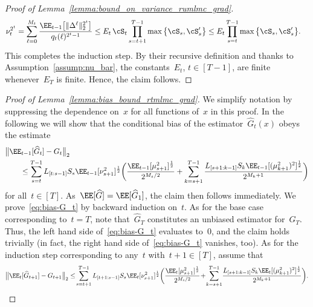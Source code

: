 \documentclass[11pt]{article}
\let\hat\widehat
\begin{document}
\begin{proof}[Proof of Lemma~\ref{lemma:bound_on_variance_rumlmc_grad}]
\begin{align*}                  
    \nu_t^{2^t} & = \sum_{\ell=0}^{M_t} \frac{\EE_{t-1}\big[\|\Delta^\ell\|^{2^t}_{2} \big]}{q_t(\ell)^{2^t-1}} 
    \leq E_t\, \cS_t \prod_{s=t+1}^{T-1} \max\big\{\cS_s, \cS_s^\prime \big\} \leq E_t\prod_{s=t}^{T-1}\max\big\{\cS_s, \cS_s^\prime \big\}.
\end{align*}
This completes the induction step. By their recursive definition and thanks to Assumption~\ref{assump:nu_bar}, the constants~$E_t$, $t \in [T-1]$, are finite whenever~$E_T$ is finite. Hence, the claim follows.
\end{proof}

\begin{proof}[Proof of Lemma~\ref{lemma:bias_bound_rtmlmc_grad}] 
We simplify notation by suppressing the dependence on~$x$ for all functions of~$x$ in this proof. In the following we will show that the conditional bias of the estimator~$\hat{G}_t(x)$ obeys the estimate
\begin{equation}
    \label{eq:bias-G_t}
    \begin{aligned}
    & \big\|\EE_{t-1}[\hat{G}_{t}]-G_{t} \big\|_2 \\ 
    & \qquad \leq \sum_{s=t}^{T-1}L_{[t:s-1]}S_s \EE_{t-1} [\nu_{s+1}^{2}]^\frac{1}{2}\bigg(\frac{ \EE_{t-1}[\mu_{s+1}^{2}]^\frac{1}{2}}{2^{M_s/2}} + \sum_{k=s+1}^{T-1} \frac{L_{[s+1:k-1]}S_k\EE_{t-1} [(\mu_{k+1}^{2})^2]^\frac{1}{2}}{2^{M_k+1}} \bigg)
    \end{aligned}
\end{equation}
for all~$t\in[T]$. As~$\EE[\hat{G}]=\EE[\hat{G}_1]$, the claim then follows immediately. We prove~\eqref{eq:bias-G_t} by backward induction on~$t$. As for the base case corresponding to~$t = T$, note that~$\hat{G}_T$ constitutes an unbiased estimator for~$G_T$. Thus, the left hand side of~\eqref{eq:bias-G_t} evaluates to~$0$, and the claim holds trivially (in fact, the right hand side of~\eqref{eq:bias-G_t} vanishes, too). As for the induction step corresponding to any~$t$ with~$t+1\in[T]$, assume that
\begin{align*}\label{eq:induction_hypothesis_bias_grad}
     \big\|\EE_{t}[\hat{G}_{t+1}]-G_{t+1} \big\|_2\leq \! \sum_{s=t+1}^{T-1}L_{[t+1:s-1]}S_s \EE_t[\nu_{s+1}^{2}]^\frac{1}{2}\bigg(\frac{ \EE_t[\mu_{s+1}^{2}]^\frac{1}{2}}{2^{M_s/2}}\! + \!\sum_{k=s+1}^{T-1} \!\frac{L_{[s+1:k-1]}S_k\EE_t[(\mu_{k+1}^{2})^2]^\frac{1}{2}}{2^{M_k+1}} \bigg).
\end{align*}

\end{proof}
\end{document}
